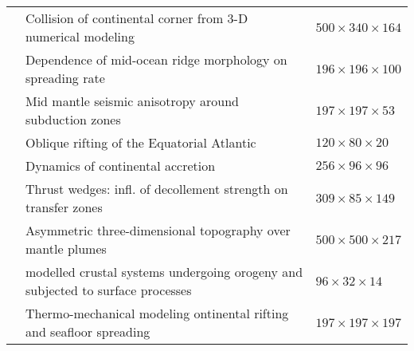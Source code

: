 {\begin{tabular}{lll}
\cite{lixg13} & Collision of continental corner from 3-D numerical modeling                     & $500 \times 340 \times 164$ \\%
\cite{puge14} & Dependence of mid-ocean ridge morphology on spreading rate                      & $196\times196\times100$ \\%
\cite{facc14} & Mid mantle seismic anisotropy around subduction zones                           & $197\times197\times53$ \\%
\cite{hebr14} & Oblique rifting of the Equatorial Atlantic                                      & $120\times80\times20$ \\%
\cite{mobm14} & Dynamics of continental accretion                                               & $256\times96\times96$ \\
\cite{rugb14} & Thrust wedges: infl. of decollement strength on transfer zones                  & $309\times85\times149$\\
\cite{buge14} & Asymmetric three-dimensional topography over mantle plumes                      & $500\times500\times217$ \\
\cite{thsh14} & modelled crustal systems undergoing orogeny and subjected to surface processes  & $96\times32\times14$\\
\cite{lige14b}& Thermo-mechanical modeling ontinental rifting and seafloor spreading            & $197\times197\times197$  \\ 
\hline
\end{tabular}
}


